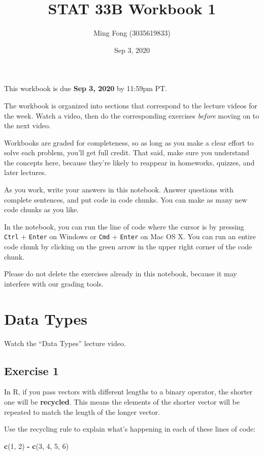 \documentclass[
]{article}
\title{STAT 33B Workbook 1}
\author{Ming Fong (3035619833)}
\date{Sep 3, 2020}
\newenvironment{Shaded}{\begin{snugshade}}{\end{snugshade}}
\newcommand{\DecValTok}[1]{\textcolor[rgb]{0.00,0.00,0.81}{#1}}
\newcommand{\KeywordTok}[1]{\textcolor[rgb]{0.13,0.29,0.53}{\textbf{#1}}}
\newcommand{\NormalTok}[1]{#1}
\newcommand{\OperatorTok}[1]{\textcolor[rgb]{0.81,0.36,0.00}{\textbf{#1}}}
\newcommand{\StringTok}[1]{\textcolor[rgb]{0.31,0.60,0.02}{#1}}
\begin{document}
\maketitle

This workbook is due \textbf{Sep 3, 2020} by 11:59pm PT.

The workbook is organized into sections that correspond to the lecture
videos for the week. Watch a video, then do the corresponding exercises
\emph{before} moving on to the next video.

Workbooks are graded for completeness, so as long as you make a clear
effort to solve each problem, you'll get full credit. That said, make
sure you understand the concepts here, because they're likely to
reappear in homeworks, quizzes, and later lectures.

As you work, write your answers in this notebook. Answer questions with
complete sentences, and put code in code chunks. You can make as many
new code chunks as you like.

In the notebook, you can run the line of code where the cursor is by
pressing \texttt{Ctrl} + \texttt{Enter} on Windows or \texttt{Cmd} +
\texttt{Enter} on Mac OS X. You can run an entire code chunk by clicking
on the green arrow in the upper right corner of the code chunk.

Please do not delete the exercises already in this notebook, because it
may interfere with our grading tools.

\hypertarget{data-types}{%
\section{Data Types}\label{data-types}}

Watch the ``Data Types'' lecture video.

\hypertarget{exercise-1}{%
\subsection{Exercise 1}\label{exercise-1}}

In R, if you pass vectors with different lengths to a binary operator,
the shorter one will be \textbf{recycled}. This means the elements of
the shorter vector will be repeated to match the length of the longer
vector.

Use the recycling rule to explain what's happening in each of these
lines of code:

\begin{Shaded}
\begin{Highlighting}[]
\KeywordTok{c}\NormalTok{(}\DecValTok{1}\NormalTok{, }\DecValTok{2}\NormalTok{) }\OperatorTok{{-}}\StringTok{ }\KeywordTok{c}\NormalTok{(}\DecValTok{3}\NormalTok{, }\DecValTok{4}\NormalTok{, }\DecValTok{5}\NormalTok{, }\DecValTok{6}\NormalTok{)}
\end{Highlighting}
\end{Shaded}
\end{document}
